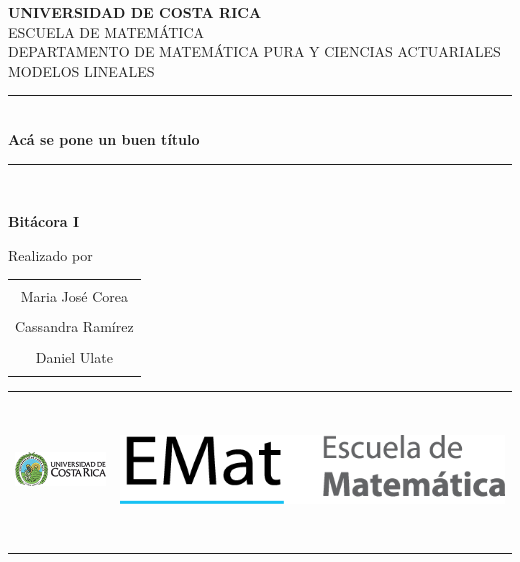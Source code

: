 \documentclass[
  oneside]{memoir}
\author{}
\date{\vspace{-2.5em}}
\newcommand{\TituloProy}{Ac\'a se pone un buen t\'itulo}  %
\newcommand{\EstudianteUno}{Maria Jos\'e Corea}
\newcommand{\EstudianteDos}{Cassandra Ram\'irez}
\newcommand{\EstudianteTres}{Daniel Ulate}
\begin{document}
\frontmatter

\begin{titlingpage}
  \newcommand{\HRule}{\rule{\linewidth}{0.5mm}} %

  \begin{center}

    {\Huge \textbf{UNIVERSIDAD DE COSTA RICA}}\\[0.2cm] 
    {\Large ESCUELA DE MATEM\'ATICA\\[0.2cm]
DEPARTAMENTO DE MATEMÁTICA PURA Y CIENCIAS ACTUARIALES\\[0.2cm] 
MODELOS LINEALES\\[0cm]
} %

   

    \HRule \\[0.6cm]
    \Large \textbf{\TituloProy}
    \HRule \\[0.6cm]

    \vfill
      
    {\Large{\textbf{Bit\'acora I}}}
   
    \vfill
    \begin{center}
      Realizado por %
      \linebreak %
      \linebreak %
      \begin{tabular}{c}
        \hline  \\
        \EstudianteUno  \\ \\
        \EstudianteDos  \\ \\
        \EstudianteTres  \\ \\
        \hline 
      \end{tabular}
    \end{center}

    \vfill
    

    

    \begin{center}
    \begin{tabular}{l @{\hskip 2in} r}
    \includegraphics[height=2cm]{./images/ucr_marca_de_agua}
  & \includegraphics[height=4cm]{./images/EMat_escuela_matematica_horizontal_1} 
    \end{tabular}
    \end{center}


\end{center}
\end{titlingpage}
\end{document}
